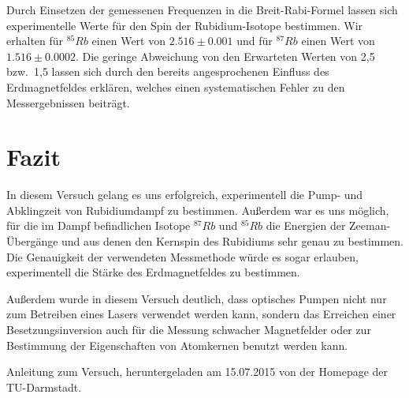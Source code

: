 \documentclass[bigchapter,colorback,accentcolor=tud4b,linedtoc,11pt]{tudreport}
\begin{document}
Durch Einsetzen der gemessenen Frequenzen in die Breit-Rabi-Formel lassen sich
experimentelle Werte für den Spin der Rubidium-Isotope bestimmen. Wir erhalten
für $^{85}Rb$ einen Wert von $2.516 \pm 0.001$ und für $^{87}Rb$ einen Wert von
$1.516 \pm 0.0002$. Die geringe Abweichung von den Erwarteten Werten von 2,5
bzw.\ 1,5 lassen sich durch den bereits angesprochenen Einfluss des
Erdmagnetfeldes erklären, welches einen systematischen Fehler zu den
Messergebnissen beiträgt.


\chapter{Fazit}
In diesem Versuch gelang es uns erfolgreich, experimentell die Pump- und
Abklingzeit von Rubidiumdampf zu bestimmen. Außerdem war es uns möglich, für die
im Dampf befindlichen Isotope $^{87}Rb$ und $^{85}Rb$ die Energien der
Zeeman-Übergänge und aus denen den Kernspin des Rubidiums sehr genau zu bestimmen. Die
Genauigkeit der verwendeten Messmethode würde es sogar erlauben, experimentell
die Stärke des Erdmagnetfeldes zu bestimmen.

Außerdem wurde in diesem Versuch deutlich, dass optisches Pumpen nicht nur
zum Betreiben eines Lasers verwendet werden kann, sondern das Erreichen einer
Besetzungsinversion auch für die Messung schwacher Magnetfelder oder zur
Bestimmung der Eigenschaften von Atomkernen benutzt werden kann.

\cleardoublepage{}
\newpage
\begin{thebibliography}{100}
   {Anleitung zum Versuch, heruntergeladen am 15.07.2015 von der Homepage der TU-Darmstadt.} 
\end{thebibliography}
\end{document}
